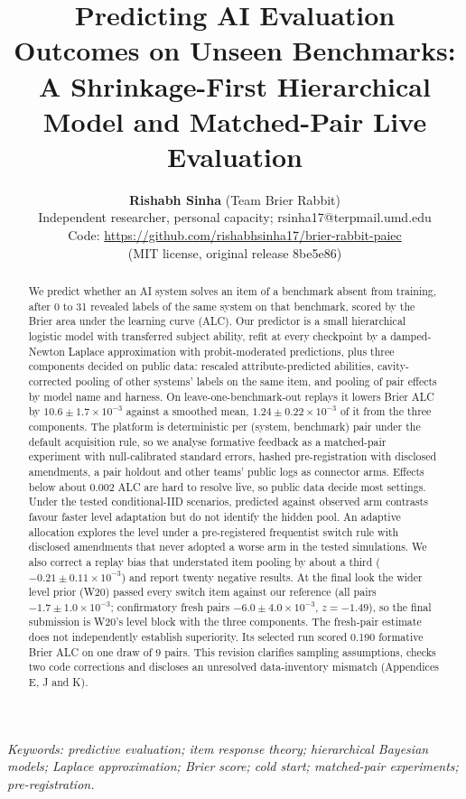 \documentclass[
]{article}
\title{Predicting AI Evaluation Outcomes on Unseen Benchmarks: A
Shrinkage-First Hierarchical Model and Matched-Pair Live Evaluation}
\author{\textbf{Rishabh Sinha} (Team Brier Rabbit) \\ Independent
researcher, personal capacity; rsinha17@terpmail.umd.edu \\ Code:
\url{https://github.com/rishabhsinha17/brier-rabbit-paiec} \\ (MIT license,
original release 8be5e86)}
\date{}
\begin{document}
\maketitle
\begin{abstract}
We predict whether an AI system solves an item of a benchmark absent
from training, after 0 to 31 revealed labels of the same system on that
benchmark, scored by the Brier area under the learning curve (ALC). Our
predictor is a small hierarchical logistic model with transferred
subject ability, refit at every checkpoint by a damped-Newton Laplace
approximation with probit-moderated predictions, plus three components
decided on public data: rescaled attribute-predicted abilities,
cavity-corrected pooling of other systems' labels on the same item, and
pooling of pair effects by model name and harness. On
leave-one-benchmark-out replays it lowers Brier ALC by
\(10.6 \pm 1.7 \times
10^{-3}\) against a smoothed mean, \(1.24 \pm 0.22 \times 10^{-3}\) of
it from the three components. The platform is deterministic per (system,
benchmark) pair under the default acquisition rule, so we analyse
formative feedback as a matched-pair experiment with null-calibrated
standard errors, hashed pre-registration with disclosed amendments, a
pair holdout and other teams' public logs as connector arms. Effects
below about 0.002 ALC are hard to resolve live, so public data decide
most settings. Under the tested conditional-IID scenarios, predicted
against observed arm contrasts favour faster level adaptation but do not
identify the hidden pool. An adaptive allocation explores the level
under a pre-registered frequentist switch rule with disclosed amendments
that never adopted a worse arm in the tested simulations. We also
correct a replay bias that understated item pooling by about a third
(\(-0.21 \pm 0.11 \times 10^{-3}\)) and report twenty negative results.
At the final look the wider level prior (W20) passed every switch item
against our reference (all pairs \(-1.7 \pm 1.0 \times 10^{-3}\);
confirmatory fresh pairs \(-6.0 \pm 4.0 \times 10^{-3}\),
\(z = -1.49\)), so the final submission is W20's level block with the
three components. The fresh-pair estimate does not independently
establish superiority. Its selected run scored 0.190 formative Brier ALC
on one draw of 9 pairs. This revision clarifies sampling assumptions,
checks two code corrections and discloses an unresolved data-inventory
mismatch (Appendices E, J and K).
\end{abstract}

\emph{Keywords: predictive evaluation; item response theory;
hierarchical Bayesian models; Laplace approximation; Brier score; cold
start; matched-pair experiments; pre-registration.}
\end{document}

